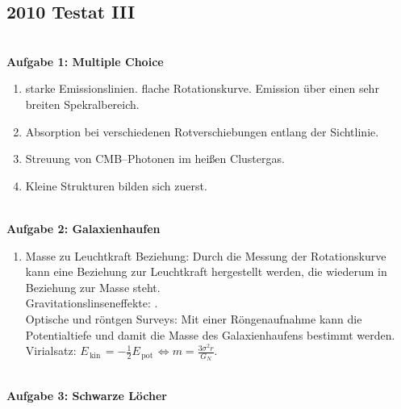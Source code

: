 \documentclass[a4paper,12pt]{article}
\numberwithin{equation}{section}
\begin{document}

\newpage


\subsection{2010 Testat III}
\hfill\\\textbf{Aufgabe 1: Multiple Choice}
\begin{enumerate}[label=\arabic*.]
        \item starke Emissionslinien. flache Rotationskurve. Emission über einen sehr breiten Spekralbereich.
        \item Absorption bei verschiedenen Rotverschiebungen entlang der Sichtlinie.
        \item Streuung von CMB--Photonen im heißen Clustergas.
        \item Kleine Strukturen bilden sich zuerst.
\end{enumerate}
\hfill\\\textbf{Aufgabe 2: Galaxienhaufen}
\begin{enumerate}[label=\arabic*.]
        \item Masse zu Leuchtkraft Beziehung: Durch die Messung der Rotationskurve kann eine Beziehung zur Leuchtkraft hergestellt werden, die wiederum in Beziehung zur Masse steht.\\
                Gravitationslinseneffekte: . \\
                Optische und röntgen Surveys: Mit einer Röngenaufnahme kann die Potentialtiefe und damit die Masse des Galaxienhaufens bestimmt werden.\\
                Virialsatz: $E_{\,\text{kin}\,}=-\tfrac{1}{2}E_{\,\text{pot}\,}\Leftrightarrow m=\tfrac{3\sigma ^2r}{G_N}$. 
\end{enumerate}
\hfill\\\textbf{Aufgabe 3: Schwarze Löcher}
\end{document}
